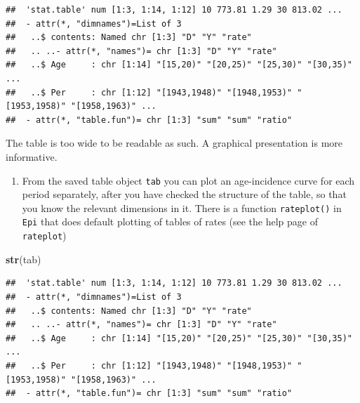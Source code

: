 \documentclass[
]{book}
\newenvironment{Shaded}{\begin{snugshade}}{\end{snugshade}}
\newcommand{\FunctionTok}[1]{\textcolor[rgb]{0.13,0.29,0.53}{\textbf{#1}}}
\newcommand{\NormalTok}[1]{#1}
\providecommand{\tightlist}{%
  \setlength{\itemsep}{0pt}\setlength{\parskip}{0pt}}
\begin{document}
\begin{verbatim}
##  'stat.table' num [1:3, 1:14, 1:12] 10 773.81 1.29 30 813.02 ...
##  - attr(*, "dimnames")=List of 3
##   ..$ contents: Named chr [1:3] "D" "Y" "rate"
##   .. ..- attr(*, "names")= chr [1:3] "D" "Y" "rate"
##   ..$ Age     : chr [1:14] "[15,20)" "[20,25)" "[25,30)" "[30,35)" ...
##   ..$ Per     : chr [1:12] "[1943,1948)" "[1948,1953)" "[1953,1958)" "[1958,1963)" ...
##  - attr(*, "table.fun")= chr [1:3] "sum" "sum" "ratio"
\end{verbatim}

The table is too wide to be readable as such. A graphical
presentation is more informative.

\begin{enumerate}
\def\labelenumi{\arabic{enumi}.}
\setcounter{enumi}{1}
\tightlist
\item
  From the saved table object \texttt{tab} you can plot an
  age-incidence curve for each period separately, after you have
  checked the structure of the table, so that you know the relevant
  dimensions in it. There is a function \texttt{rateplot()} in \texttt{Epi}
  that does default plotting of tables of rates (see the help page of
  \texttt{rateplot})
\end{enumerate}

\begin{Shaded}
\begin{Highlighting}[]
\FunctionTok{str}\NormalTok{(tab)}
\end{Highlighting}
\end{Shaded}

\begin{verbatim}
##  'stat.table' num [1:3, 1:14, 1:12] 10 773.81 1.29 30 813.02 ...
##  - attr(*, "dimnames")=List of 3
##   ..$ contents: Named chr [1:3] "D" "Y" "rate"
##   .. ..- attr(*, "names")= chr [1:3] "D" "Y" "rate"
##   ..$ Age     : chr [1:14] "[15,20)" "[20,25)" "[25,30)" "[30,35)" ...
##   ..$ Per     : chr [1:12] "[1943,1948)" "[1948,1953)" "[1953,1958)" "[1958,1963)" ...
##  - attr(*, "table.fun")= chr [1:3] "sum" "sum" "ratio"
\end{verbatim}
\end{document}
